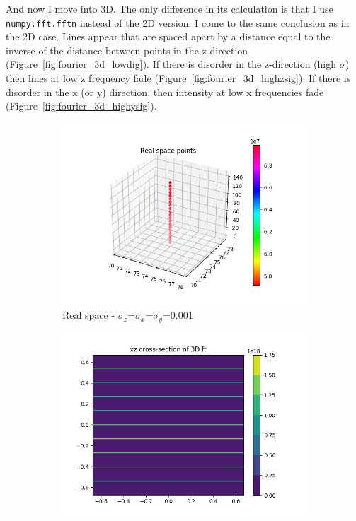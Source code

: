\documentclass{article}
\begin{document}
And now I move into 3D. The only difference in its calculation is that I use
\texttt{numpy.fft.fftn} instead of the 2D version. I come to the same
conclusion as in the 2D case. Lines appear that are spaced apart by a distance
equal to the inverse of the distance between points in the z direction
(Figure~\ref{fig:fourier_3d_lowdig}).  If there is disorder in the z-direction
(high $\sigma$) then lines at low z frequency fade
(Figure~\ref{fig:fourier_3d_highzsig}). If there is disorder in the x (or y)
direction, then intensity at low x frequencies fade
(Figure~\ref{fig:fourier_3d_highysig}).

\begin{figure}[h]
	\centering
        \begin{subfigure}{0.45\textwidth}
                \centering
                \includegraphics[width=\textwidth]{real_3d_lowsig.png}
                \caption{Real space - $\sigma_z$=$\sigma_x$=$\sigma_y$=0.001}\label{fig:real_3d_lowsig}
        \end{subfigure}
        \begin{subfigure}{0.45\textwidth}
                \centering
                \includegraphics[width=\textwidth]{fourier_3d_lowsig.png}

\end{subfigure}
\end{figure}
\end{document}
